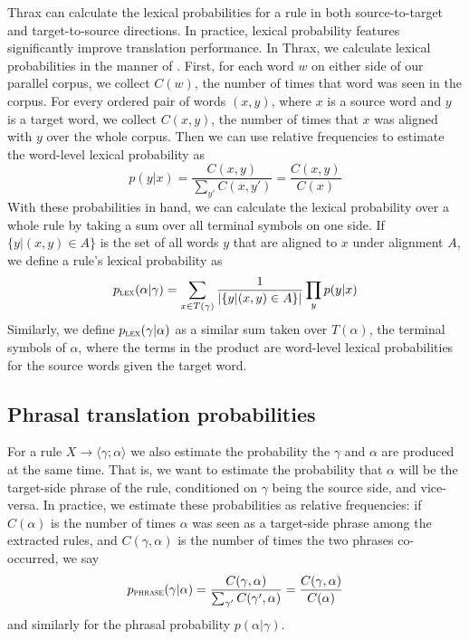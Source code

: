 \documentclass{pbml}
\begin{document}
Thrax can calculate the lexical probabilities for a rule in both source-to-target and target-to-source directions. In practice, lexical probability features significantly improve translation performance. In Thrax, we calculate lexical probabilities in the manner of \cite{koehn2003}. First, for each word $w$ on either side of our parallel corpus, we collect $C(w)$, the number of times that word was seen in the corpus. For every ordered pair of words $(x,y)$, where $x$ is a source word and $y$ is a target word, we collect $C(x,y)$, the number of times that $x$ was aligned with $y$ over the whole corpus. Then we can use relative frequencies to estimate the word-level lexical probability as
$$p(y|x) = \frac{C(x,y)}{\sum_{y'}C(x,y')} = \frac{C(x,y)}{C(x)}$$
With these probabilities in hand, we can calculate the lexical probability over a whole rule by taking a sum over all terminal symbols on one side. If $\{y | (x,y) \in A\}$ is the set of all words $y$ that are aligned to $x$ under alignment $A$, we define a rule's lexical probability as
$$p_{\textsc{lex}}(\alpha | \gamma) = \sum_{x \in T(\gamma)}\frac{1}{|\{y | (x,y) \in A\}|}\prod_{y}p(y|x)$$
Similarly, we define $p_{\textsc{lex}}(\gamma | \alpha)$ as a similar sum taken over $T(\alpha)$, the terminal symbols of $\alpha$, where the terms in the product are word-level lexical probabilities for the source words given the target word.

\subsection{Phrasal translation probabilities}
For a rule $X \to \langle \gamma ; \alpha \rangle$ we also estimate the probability the $\gamma$ and $\alpha$ are produced at the same time. That is, we want to estimate the probability that $\alpha$ will be the target-side phrase of the rule, conditioned on $\gamma$ being the source side, and vice-versa. In practice, we estimate these probabilities as relative frequencies: if $C(\alpha)$ is the number of times $\alpha$ was seen as a target-side phrase among the extracted rules, and $C(\gamma,\alpha)$ is the number of times the two phrases co-occurred, we say
$$p_{\textsc{phrase}}(\gamma | \alpha) = \frac{C(\gamma,\alpha)}{\sum_{\gamma'}C(\gamma',\alpha)} = \frac{C(\gamma,\alpha)}{C(\alpha)}$$
and similarly for the phrasal probability $p(\alpha|\gamma)$.
\end{document}
